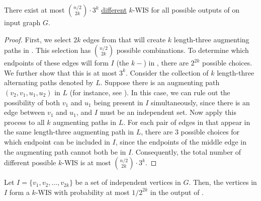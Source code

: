 \begin{claim}\label{clm:kltap-bound}
    There exist at most ${n/2 \choose 2k} \cdot 3^k$ \underline{different} $k$-WIS for all possible outputs of \rnk{} on input graph $G$.
\end{claim}
\begin{proof}
    First, we select $2k$ edges from \opt{} that will create $k$ length-three augmenting paths in . This selection has ${n/2 \choose 2k}$ possible combinations. To determine which endpoints of these edges will form $I$ (the $k-$\wis{}) in , there are $2^{2k}$ possible choices. We further show that this is at most $3^k$. Consider the collection of $k$ length-three alternating paths denoted by $L$. Suppose there is an augmenting path $(v_2, v_1, u_1, u_2)$ in $L$ (for instance, see ). In this case, we can rule out the possibility of both $v_1$ and $u_1$ being present in $I$ simultaneously, since there is an edge between $v_1$ and $u_1$, and $I$ must be an independent set. Now apply this process to all $k$ augmenting paths in $L$. For each pair of edges in \opt{} that appear in the same length-three augmenting path in $L$, there are 3 possible choices for which endpoint can be included in $I$, since the endpoints of the middle edge in the augmenting path cannot both be in $I$. Consequently, the total number of different possible $k$-WIS is at most ${n/2 \choose 2k} \cdot 3^k$.
\end{proof}






\begin{claim}\label{lem:prob-bound}
Let $I = \{v_1, v_2, \ldots, v_{2k}\}$ be a set of independent vertices in $G$. Then, the vertices in $I$ form a $k$-WIS with probability at most $1/2^{2k}$ in the output of \rnk{}.
\end{claim}

